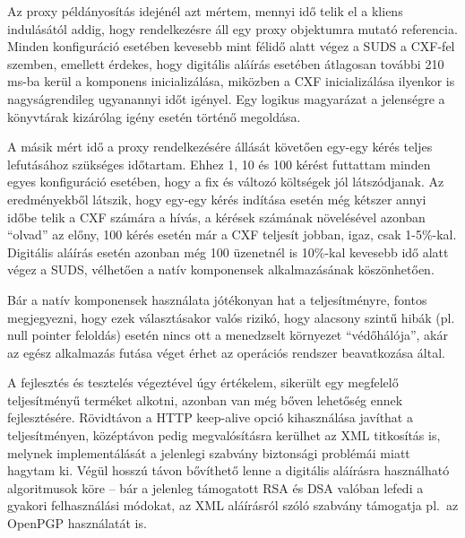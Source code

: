 Az proxy példányosítás idejénél azt mértem, mennyi idő telik el a kliens indulásától addig, hogy rendelkezésre áll egy proxy objektumra mutató referencia. Minden konfiguráció esetében kevesebb mint félidő alatt végez a SUDS a CXF-fel szemben, emellett érdekes, hogy digitális aláírás esetében átlagosan további 210 ms-ba kerül a komponens inicializálása, miközben a CXF inicializálása ilyenkor is nagyságrendileg ugyanannyi időt igényel. Egy logikus magyarázat a jelenségre a könyvtárak kizárólag igény esetén történő megoldása.

A másik mért idő a proxy rendelkezésére állását követően egy-egy kérés teljes lefutásához szükséges időtartam. Ehhez 1, 10 és 100 kérést futtattam minden egyes konfiguráció esetében, hogy a fix és változó költségek jól látszódjanak. Az eredményekből látszik, hogy egy-egy kérés indítása esetén még kétszer annyi időbe telik a CXF számára a hívás, a kérések számának növelésével azonban ``olvad'' az előny, 100 kérés esetén már a CXF teljesít jobban, igaz, csak 1-5\%-kal. Digitális aláírás esetén azonban még 100 üzenetnél is 10\%-kal kevesebb idő alatt végez a SUDS, vélhetően a natív komponensek alkalmazásának köszönhetően.

Bár a natív komponensek használata jótékonyan hat a teljesítményre, fontos megjegyezni, hogy ezek választásakor valós rizikó, hogy alacsony szintű hibák (pl. null pointer feloldás) esetén nincs ott a menedzselt környezet ``védőhálója'', akár az egész alkalmazás futása véget érhet az operációs rendszer beavatkozása által.

\bigskip

A fejlesztés és tesztelés végeztével úgy értékelem, sikerült egy megfelelő teljesítményű terméket alkotni, azonban van még bőven lehetőség ennek fejlesztésére. Rövidtávon a HTTP keep-alive opció kihasználása javíthat a teljesítményen, középtávon pedig megvalósításra kerülhet az XML titkosítás is, melynek implementálását a jelenlegi szabvány biztonsági problémái miatt hagytam ki. Végül hosszú távon bővíthető lenne a digitális aláírásra használható algoritmusok köre -- bár a jelenleg támogatott RSA és DSA valóban lefedi a gyakori felhasználási módokat, az XML aláírásról szóló szabvány támogatja pl.\ az OpenPGP használatát is.


